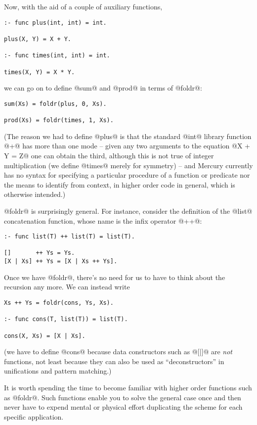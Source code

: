 
Now, with the aid of a couple of auxiliary functions,
\begin{verbatim}
:- func plus(int, int) = int.

plus(X, Y) = X + Y.

:- func times(int, int) = int.

times(X, Y) = X * Y.
\end{verbatim}
we can go on to define @sum@ and @prod@ in terms of @foldr@:
\begin{verbatim}
sum(Xs) = foldr(plus, 0, Xs).

prod(Xs) = foldr(times, 1, Xs).
\end{verbatim}
(The reason we had to define @plus@ is that the standard @int@ library
function @+@ has more than one mode -- given any two arguments to the
equation @X + Y = Z@ one can obtain the third, although this is not true
of integer multiplication (we define @times@ merely for symmetry) -- and
Mercury currently has no syntax for specifying a particular procedure of
a function or predicate nor the means to identify from context, in
higher order code in general, which is otherwise intended.) 

@foldr@ is surprisingly general.  For instance, consider the definition
of the @list@ concatenation function, whose name is the infix operator
@++@:
\begin{verbatim}
:- func list(T) ++ list(T) = list(T).

[]       ++ Ys = Ys.
[X | Xs] ++ Ys = [X | Xs ++ Ys].
\end{verbatim}
Once we have @foldr@, there's no need for us to have to think about the
recursion any more.  We can instead write
\begin{verbatim}
Xs ++ Ys = foldr(cons, Ys, Xs).

:- func cons(T, list(T)) = list(T).

cons(X, Xs) = [X | Xs].
\end{verbatim}
(we have to define @cons@ because data constructors such as @[|]@ are
\emph{not} functions, not least because they can also be used as
``deconstructors'' in unifications and pattern matching.)

It is worth spending the time to become familiar with higher order
functions such as @foldr@.  Such functions enable you to solve the
general case once and then never have to expend mental or physical
effort duplicating the scheme for each specific application.

